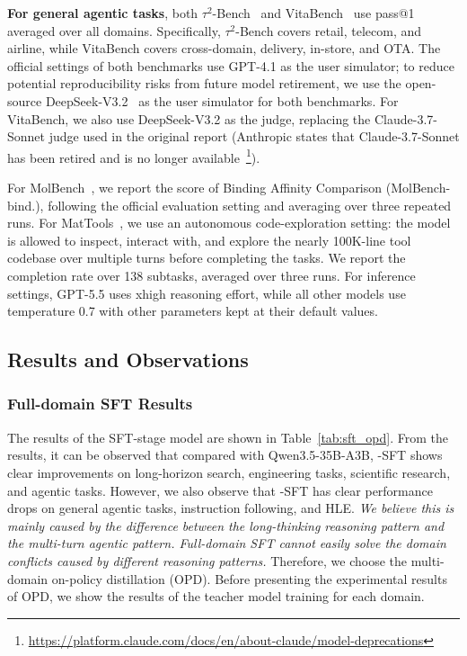\textbf{For general agentic tasks}, both $\tau^2$-Bench~\citep{barres2025tau2} and VitaBench~\citep{he2025vitabench} use pass@1 averaged over all domains. Specifically, $\tau^2$-Bench covers retail, telecom, and airline, while VitaBench covers cross-domain, delivery, in-store, and OTA. The official settings of both benchmarks use GPT-4.1 as the user simulator; to reduce potential reproducibility risks from future model retirement, we use the open-source DeepSeek-V3.2~\citep{liu2025deepseek} as the user simulator for both benchmarks. For VitaBench, we also use DeepSeek-V3.2 as the judge, replacing the Claude-3.7-Sonnet judge used in the original report (Anthropic states that Claude-3.7-Sonnet has been retired and is no longer available~\footnote{\url{https://platform.claude.com/docs/en/about-claude/model-deprecations}}). 

For MolBench~\citep{zhang2026molclaw}, we report the score of Binding Affinity Comparison (MolBench-bind.), following the official evaluation setting and averaging over three repeated runs. For MatTools~\citep{MatTools}, we use an autonomous code-exploration setting: the model is allowed to inspect, interact with, and explore the nearly 100K-line tool codebase over multiple turns before completing the tasks. We report the completion rate over 138 subtasks, averaged over three runs. For inference settings, GPT-5.5 uses xhigh reasoning effort, while all other models use temperature 0.7 with other parameters kept at their default values.

\subsection{Results and Observations} 



\subsubsection{Full-domain SFT Results} 
\label{sec:sft_results}

The results of the SFT-stage model are shown in Table~\ref{tab:sft_opd}. From the results, it can be observed that compared with Qwen3.5-35B-A3B, \ProjectName-SFT shows clear improvements on long-horizon search, engineering tasks, scientific research, and agentic tasks. However, we also observe that \ProjectName-SFT has clear performance drops on general agentic tasks, instruction following, and HLE. \textit{We believe this is mainly caused by the difference between the long-thinking reasoning pattern and the multi-turn agentic pattern. Full-domain SFT cannot easily solve the domain conflicts caused by different reasoning patterns.} Therefore, we choose the multi-domain on-policy distillation (OPD). Before presenting the experimental results of OPD, we show the results of the teacher model training for each domain.

